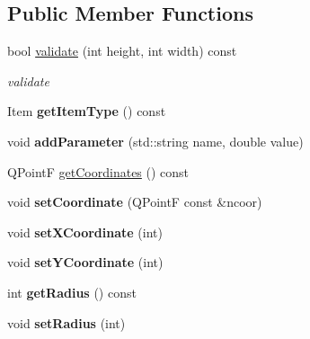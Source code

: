 \subsection*{Public Member Functions}
\begin{DoxyCompactItemize}
\item 
\hypertarget{classBallConfigItem_ae3b96332ceedd324cca9e103f49c02e0}{bool \hyperlink{classBallConfigItem_ae3b96332ceedd324cca9e103f49c02e0}{validate} (int height, int width) const }\label{classBallConfigItem_ae3b96332ceedd324cca9e103f49c02e0}

\begin{DoxyCompactList}\small\item\em validate \end{DoxyCompactList}\item 
\hypertarget{classBallConfigItem_af6ac195294f3ec979966d1bb3630244e}{Item {\bfseries get\-Item\-Type} () const }\label{classBallConfigItem_af6ac195294f3ec979966d1bb3630244e}

\item 
\hypertarget{classBallConfigItem_a72d0624866b2ba494dc96c0a9c900a34}{void {\bfseries add\-Parameter} (std\-::string name, double value)}\label{classBallConfigItem_a72d0624866b2ba494dc96c0a9c900a34}

\item 
Q\-Point\-F \hyperlink{classBallConfigItem_a14b2c2bfde025cb9b5ed4616aa7ef652}{get\-Coordinates} () const 
\item 
\hypertarget{classBallConfigItem_a5bb1e113d6f47c03b68803f37a136b4a}{void {\bfseries set\-Coordinate} (Q\-Point\-F const \&ncoor)}\label{classBallConfigItem_a5bb1e113d6f47c03b68803f37a136b4a}

\item 
\hypertarget{classBallConfigItem_a334cb9d9683fb1631a252fafbb045e4d}{void {\bfseries set\-X\-Coordinate} (int)}\label{classBallConfigItem_a334cb9d9683fb1631a252fafbb045e4d}

\item 
\hypertarget{classBallConfigItem_a044e72a6289b872a3bc83f76332027f4}{void {\bfseries set\-Y\-Coordinate} (int)}\label{classBallConfigItem_a044e72a6289b872a3bc83f76332027f4}

\item 
\hypertarget{classBallConfigItem_a9ccb7fcbe037c7e7fa743b10b7b8dfac}{int {\bfseries get\-Radius} () const }\label{classBallConfigItem_a9ccb7fcbe037c7e7fa743b10b7b8dfac}

\item 
\hypertarget{classBallConfigItem_a43926c30079eecf2ede3e1ad2d72259e}{void {\bfseries set\-Radius} (int)}\label{classBallConfigItem_a43926c30079eecf2ede3e1ad2d72259e}


\end{DoxyCompactItemize}
